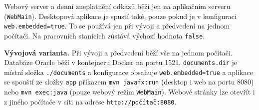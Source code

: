 Webový server a denní zneplatnění odkazů běží jen na aplikačním serveru (\texttt{WebMain}). Desktopová aplikace je spustí také, pouze pokud je v konfiguraci \texttt{web.embedded=true}. To se používá jen při vývoji a předvedení na jednom počítači. Na pracovních stanicích zůstává výchozí hodnota \texttt{false}.

\textbf{Vývojová varianta.} Při vývoji a předvedení běží vše na jednom počítači. Databáze Oracle běží v kontejneru Docker na portu 1521, \texttt{documents.dir} je místní složka \texttt{./documents} a konfigurace obsahuje \texttt{web.embedded=true} a aplikace se spouští ze složky \texttt{app} příkazem \texttt{mvn javafx:run} (desktop i web na portu 8080) nebo \texttt{mvn exec:java} (pouze webový režim \texttt{WebMain}). Webové stránky lze otevřít i z jiného počítače v síti na adrese \texttt{http://počítač:8080}.
\endgroup
